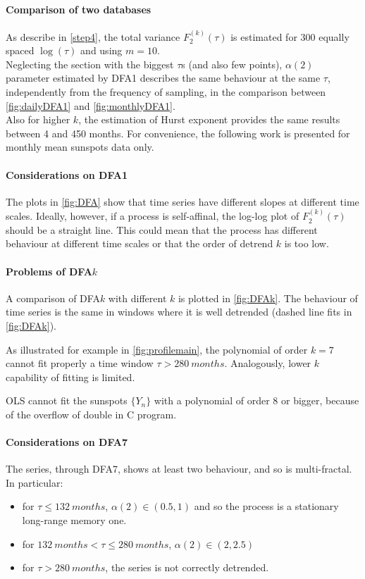 \paragraph{Comparison of two databases}
As describe in \autoref{step4}, the total variance $F_2^{( k )}(\tau)$ is estimated for 300 equally spaced $\log(\tau)$ and using $m = 10$.\\
Neglecting the section with the biggest $\tau$s (and also few points), $\alpha(2)$ parameter estimated by DFA1 describes the same behaviour at the same $\tau$, independently from the frequency of sampling, in the comparison between \autoref{fig:dailyDFA1} and \autoref{fig:monthlyDFA1}.\\
Also for higher $k$, the estimation of Hurst exponent provides the same results between 4 and 450 months. For convenience, the following work is presented for monthly mean sunspots data only. 

\paragraph{Considerations on DFA1}
The plots in \autoref{fig:DFA} show that time series have different slopes at different time scales. Ideally, however, if a process is self-affinal, the log-log plot of $F_2^{( k )}(\tau)$ should be a straight line. This could mean that the process has different behaviour at different time scales or that the order of detrend $k$ is too low.

\paragraph{Problems of DFA$k$}
A comparison of DFA$k$ with different $k$ is plotted in \autoref{fig:DFAk}. 
The behaviour of time series is the same in windows where it is well detrended (dashed line fits in \autoref{fig:DFAk}).

As illustrated for example in \autoref{fig:profilemain}, the polynomial of order $k=7$ cannot fit properly a time window $\tau > \SI{280}{months}$. Analogously, lower $k$ capability of fitting is limited. 

OLS cannot fit the sunspots $\{Y_n\}$ with a polynomial of order 8 or bigger, because of the overflow of double in C program.

\paragraph{Considerations on DFA7}
The series, through DFA7, shows at least two behaviour, and so is multi-fractal. In particular:
\begin{itemize}
	\item for $\tau \le \SI{132}{months}$, $\alpha(2) \in (0.5, 1)$ and so the process is a stationary long-range memory one.
	\item for $\SI{132}{months} < \tau \le \SI{280}{months}$, $\alpha(2) \in (2, 2.5)$ 
	\item for $\tau > \SI{280}{months}$, the series is not correctly detrended.
\end{itemize}


